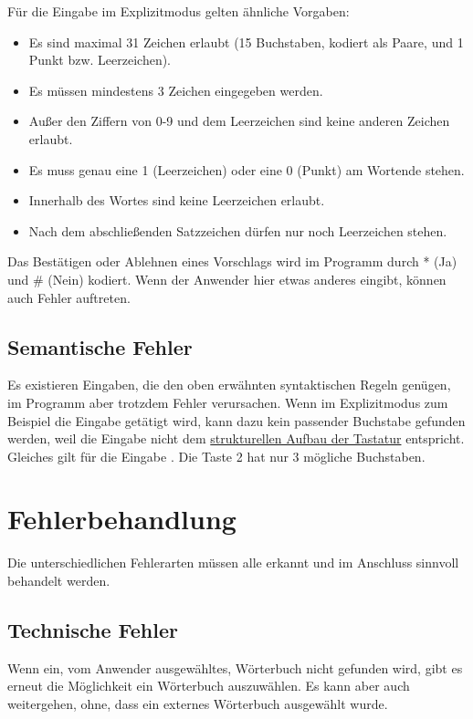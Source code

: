 Für die Eingabe im Explizitmodus gelten ähnliche Vorgaben:
\begin{itemize}[noitemsep]
    \item Es sind maximal 31 Zeichen erlaubt (15 Buchstaben, kodiert als Paare, und 1 Punkt bzw. Leerzeichen).
    \item Es müssen mindestens 3 Zeichen eingegeben werden.
    \item Außer den Ziffern von 0-9 und dem Leerzeichen sind keine anderen Zeichen erlaubt.
    \item Es muss genau eine 1 (Leerzeichen) oder eine 0 (Punkt) am Wortende stehen.
    \item Innerhalb des Wortes sind keine Leerzeichen erlaubt.
    \item Nach dem abschließenden Satzzeichen dürfen nur noch Leerzeichen stehen.
\end{itemize}

Das Bestätigen oder Ablehnen eines Vorschlags wird im Programm durch * (Ja) und \# (Nein) kodiert.
Wenn der Anwender hier etwas anderes eingibt, können auch Fehler auftreten.

\subsection{Semantische Fehler}\label{subsec:semantische-fehler}
Es existieren Eingaben, die den oben erwähnten syntaktischen Regeln genügen, im Programm aber trotzdem Fehler verursachen.
Wenn im Explizitmodus zum Beispiel die Eingabe \grqq{} getätigt wird, kann dazu kein passender Buchstabe gefunden werden, weil die Eingabe nicht dem \hyperref[tab:tastatur-aufbau]{strukturellen Aufbau der Tastatur} entspricht.
Gleiches gilt für die Eingabe \grqq{}.
Die Taste 2 hat nur 3 mögliche Buchstaben.

\section{Fehlerbehandlung}\label{sec:fehlerbehandlung}
Die unterschiedlichen Fehlerarten müssen alle erkannt und im Anschluss sinnvoll behandelt werden.

\subsection{Technische Fehler}\label{subsec:technische-fehler-behandlung}
Wenn ein, vom Anwender ausgewähltes, Wörterbuch nicht gefunden wird, gibt es erneut die Möglichkeit ein Wörterbuch auszuwählen.
Es kann aber auch weitergehen, ohne, dass ein externes Wörterbuch ausgewählt wurde.

